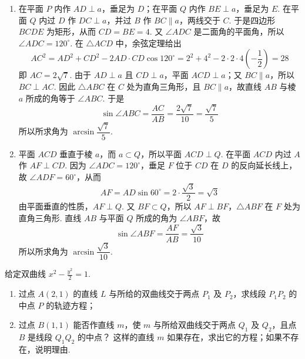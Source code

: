 \begin{solution}
\begin{enumerate}
\item 在平面 \(P\) 内作 \(AD\perp a\)，垂足为 \(D\)；在平面 \(Q\) 内作 \(BE\perp a\)，垂足为 \(E\). 在平面 \(Q\) 内过 \(D\) 作 \(DC\perp a\)，并过 \(B\) 作 \(BC\parallel a\)，两线交于 \(C\). 于是四边形 \(BCDE\) 为矩形，从而 \(CD=BE=4\). 又 \(\angle ADC\) 是二面角的平面角，所以 \(\angle ADC=120^\circ\). 在 \(\triangle ACD\) 中，余弦定理给出
\[
AC^2=AD^2+CD^2-2AD\cdot CD\cos120^\circ=2^2+4^2-2\cdot2\cdot4\left(-\frac12\right)=28
\]
即 \(AC=2\sqrt7\). 由于 \(AD\perp a\) 且 \(CD\perp a\)，平面 \(ACD\perp a\)；又 \(BC\parallel a\)，所以 \(BC\perp AC\). 因此 \(\triangle ABC\) 在 \(C\) 处为直角三角形，且 \(BC\parallel a\)，故直线 \(AB\) 与棱 \(a\) 所成的角等于 \(\angle ABC\). 于是
\[
\sin\angle ABC=\frac{AC}{AB}=\frac{2\sqrt7}{10}=\frac{\sqrt7}{5}
\]
所以所求角为 \(\arcsin\dfrac{\sqrt7}{5}\).
\item 平面 \(ACD\) 垂直于棱 \(a\)，而 \(a\subset Q\)，所以平面 \(ACD\perp Q\). 在平面 \(ACD\) 内过 \(A\) 作 \(AF\perp CD\). 因为 \(\angle ADC=120^\circ\)，垂足 \(F\) 位于 \(CD\) 在 \(D\) 的反向延长线上，故 \(\angle ADF=60^\circ\)，从而
\[
AF=AD\sin60^\circ=2\cdot\frac{\sqrt3}{2}=\sqrt3
\]
由平面垂直的性质，\(AF\perp Q\). 又 \(BF\subset Q\)，所以 \(AF\perp BF\)，\(\triangle ABF\) 在 \(F\) 处为直角三角形. 直线 \(AB\) 与平面 \(Q\) 所成的角为 \(\angle ABF\)，故
\[
\sin\angle ABF=\frac{AF}{AB}=\frac{\sqrt3}{10}
\]
所以所求角为 \(\arcsin\dfrac{\sqrt3}{10}\).
\end{enumerate}
\end{solution}

\begin{problem}
给定双曲线 \(x^{2}-\frac{y^{2}}{2}=1\).

\begin{enumerate}
\item 过点 \(A(2,1)\) 的直线 \(L\) 与所给的双曲线交于两点 \(P_{1}\) 及 \(P_{2}\)，求线段 \(P_{1}P_{2}\) 的中点 \(P\) 的轨迹方程；
\item 过点 \(B(1,1)\) 能否作直线 \(m\)，使 \(m\) 与所给双曲线交于两点 \(Q_{1}\) 及 \(Q_{2}\)，且点 \(B\) 是线段 \(Q_{1}Q_{2}\) 的中点？ 这样的直线 \(m\) 如果存在，求出它的方程；如果不存在，说明理由.
\end{enumerate}
\end{problem}

